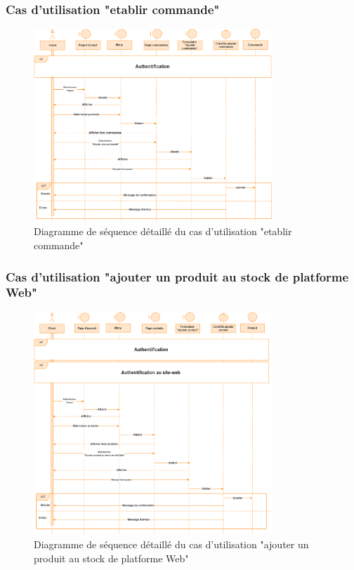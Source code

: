 \documentclass[edit,12pt,a4paper,ChapStyle,oneside,doubleinterligne]{report}
\begin{document}
\subsubsection{Cas d'utilisation "etablir commande"}
\begin{figure}[H]\label{fig:etablir commande}
\centering
\includegraphics[width=0.8\textwidth]{images/Cas_ etablir commande.png}
\caption{Diagramme de séquence détaillé du cas d'utilisation "etablir commande"}
\end{figure}
\clearpage

\subsubsection{Cas d'utilisation "ajouter un produit au stock de platforme Web"}
\begin{figure}[H]\label{fig:Ajouter un produit au stock de site Web}
\centering
\includegraphics[width=0.8\textwidth]{images/Cas_ Ajouter un produit au stock de site Web.png}
\caption{Diagramme de séquence détaillé du cas d'utilisation "ajouter un produit au stock de platforme Web"}
\end{figure}
\end{document}
